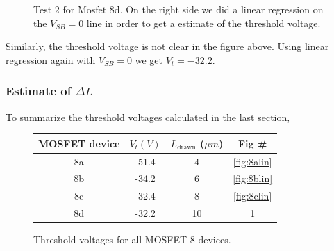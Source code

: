 \documentclass{article}
\begin{document}
\begin{figure}[H]
\centering
{}
\caption{Test 2 for Mosfet 8d. On the right side we did a linear regression on the $V_{SB} = 0$ line in order to get a estimate of the threshold voltage.}
\label{fig:8dlin}
\end{figure}

Similarly, the threshold voltage is not clear in the figure above. Using linear regression again with $V_{SB} = 0$ we get $V_t = -32.2$.

\subsubsection{Estimate of $\Delta L$}
To summarize the threshold voltages calculated in the last section,
\begin{figure}[H]
\centering
\begin{tabular}{c || c | c | c }
MOSFET device & $V_t (V)$ & $L_{\text{drawn}}$ ($\mu m$) & Fig \# \\ \hline
8a & -51.4 & 4 & \textcolor{blue}{\ref{fig:8alin}} \\ \hline
8b & -34.2 & 6 & \textcolor{blue}{\ref{fig:8blin}}\\ \hline
8c & -32.4 & 8 & \textcolor{blue}{\ref{fig:8clin}}\\ \hline
8d & -32.2 & 10 & \textcolor{blue}{\ref{fig:8dlin}}\\ \hline
\end{tabular}
\caption{Threshold voltages for all MOSFET 8 devices.}
\end{figure}
\end{document}
